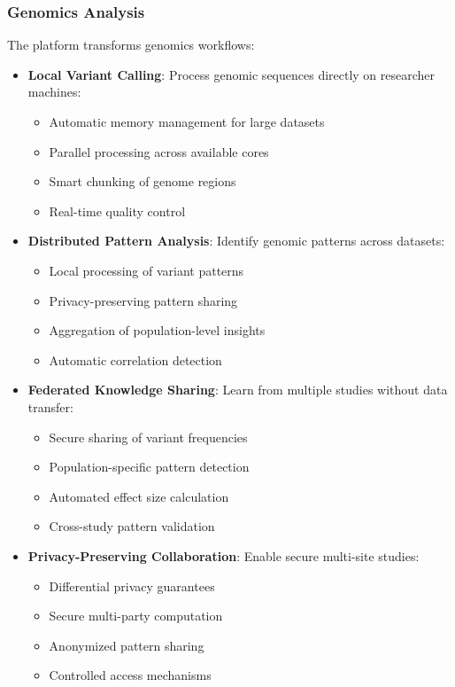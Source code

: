 \documentclass[11pt,a4paper]{article}
\begin{document}
\subsubsection{Genomics Analysis}
The platform transforms genomics workflows:
\begin{itemize}
    \item \textbf{Local Variant Calling}: Process genomic sequences directly on researcher machines:
    \begin{itemize}
        \item Automatic memory management for large datasets
        \item Parallel processing across available cores
        \item Smart chunking of genome regions
        \item Real-time quality control
    \end{itemize}
    
    \item \textbf{Distributed Pattern Analysis}: Identify genomic patterns across datasets:
    \begin{itemize}
        \item Local processing of variant patterns
        \item Privacy-preserving pattern sharing
        \item Aggregation of population-level insights
        \item Automatic correlation detection
    \end{itemize}
    
    \item \textbf{Federated Knowledge Sharing}: Learn from multiple studies without data transfer:
    \begin{itemize}
        \item Secure sharing of variant frequencies
        \item Population-specific pattern detection
        \item Automated effect size calculation
        \item Cross-study pattern validation
    \end{itemize}
    
    \item \textbf{Privacy-Preserving Collaboration}: Enable secure multi-site studies:
    \begin{itemize}
        \item Differential privacy guarantees
        \item Secure multi-party computation
        \item Anonymized pattern sharing
        \item Controlled access mechanisms
    \end{itemize}
\end{itemize}
\end{document}
